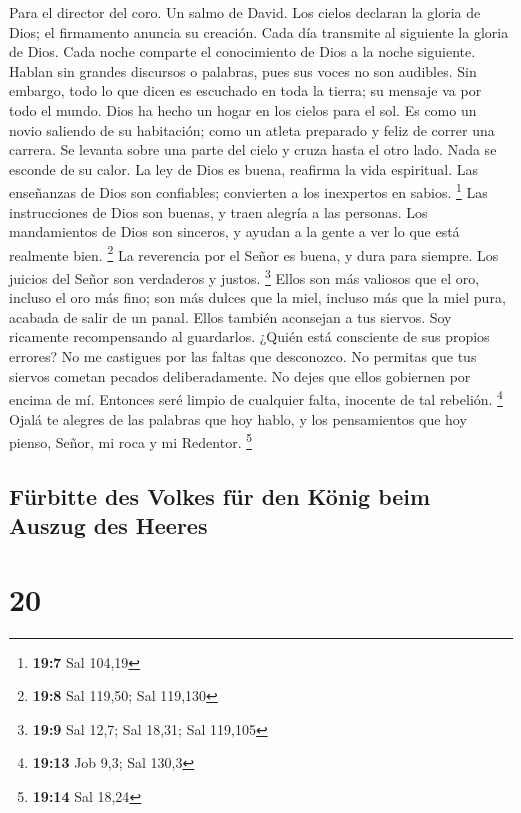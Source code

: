 Para el director del coro. Un salmo de David.  Los cielos
declaran la gloria de Dios; el firmamento anuncia su creación.
 Cada día transmite al siguiente la gloria de Dios. Cada
noche comparte el conocimiento de Dios a la noche siguiente.
 Hablan sin grandes discursos o palabras, pues sus voces no
son audibles.  Sin embargo, todo lo que dicen es escuchado
en toda la tierra; su mensaje va por todo el mundo. Dios ha hecho un
hogar en los cielos para el sol.  Es como un novio saliendo
de su habitación; como un atleta preparado y feliz de correr una
carrera.  Se levanta sobre una parte del cielo y cruza hasta
el otro lado. Nada se esconde de su calor.  La ley de Dios
es buena, reafirma la vida espiritual. Las enseñanzas de Dios son
confiables; convierten a los inexpertos en sabios. \footnote{\textbf{19:7}
  Sal 104,19}  Las instrucciones de Dios son buenas, y traen
alegría a las personas. Los mandamientos de Dios son sinceros, y ayudan
a la gente a ver lo que está realmente bien. \footnote{\textbf{19:8} Sal
  119,50; Sal 119,130}  La reverencia por el Señor es buena,
y dura para siempre. Los juicios del Señor son verdaderos y justos.
\footnote{\textbf{19:9} Sal 12,7; Sal 18,31; Sal 119,105} 
Ellos son más valiosos que el oro, incluso el oro más fino; son más
dulces que la miel, incluso más que la miel pura, acabada de salir de un
panal.  Ellos también aconsejan a tus siervos. Soy
ricamente recompensando al guardarlos.  ¿Quién está
consciente de sus propios errores? No me castigues por las faltas que
desconozco.  No permitas que tus siervos cometan pecados
deliberadamente. No dejes que ellos gobiernen por encima de mí. Entonces
seré limpio de cualquier falta, inocente de tal rebelión. \footnote{\textbf{19:13}
  Job 9,3; Sal 130,3}  Ojalá te alegres de las palabras que
hoy hablo, y los pensamientos que hoy pienso, Señor, mi roca y mi
Redentor. \footnote{\textbf{19:14} Sal 18,24}

\hypertarget{fuxfcrbitte-des-volkes-fuxfcr-den-kuxf6nig-beim-auszug-des-heeres}{%
\subsection{Fürbitte des Volkes für den König beim Auszug des
Heeres}\label{fuxfcrbitte-des-volkes-fuxfcr-den-kuxf6nig-beim-auszug-des-heeres}}

\hypertarget{section-19}{%
\section{20}\label{section-19}}

